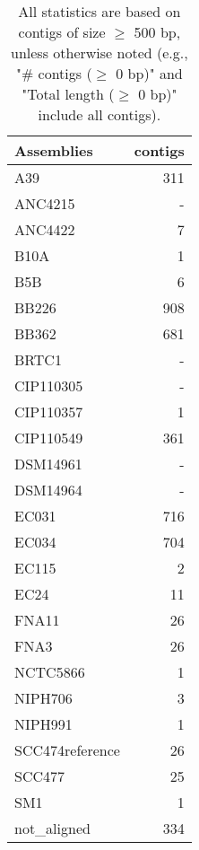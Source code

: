 \documentclass[12pt,a4paper]{article}
\begin{document}
\begin{table}[ht]
\begin{center}
\caption{All statistics are based on contigs of size $\geq$ 500 bp, unless otherwise noted (e.g., "\# contigs ($\geq$ 0 bp)" and "Total length ($\geq$ 0 bp)" include all contigs).}
\begin{tabular}{|l*{1}{|r}|}
\hline
Assemblies & contigs \\ \hline
A39 & 311 \\ \hline
ANC4215 & - \\ \hline
ANC4422 & 7 \\ \hline
B10A & 1 \\ \hline
B5B & 6 \\ \hline
BB226 & 908 \\ \hline
BB362 & 681 \\ \hline
BRTC1 & - \\ \hline
CIP110305 & - \\ \hline
CIP110357 & 1 \\ \hline
CIP110549 & 361 \\ \hline
DSM14961 & - \\ \hline
DSM14964 & - \\ \hline
EC031 & 716 \\ \hline
EC034 & 704 \\ \hline
EC115 & 2 \\ \hline
EC24 & 11 \\ \hline
FNA11 & 26 \\ \hline
FNA3 & 26 \\ \hline
NCTC5866 & 1 \\ \hline
NIPH706 & 3 \\ \hline
NIPH991 & 1 \\ \hline
SCC474reference & 26 \\ \hline
SCC477 & 25 \\ \hline
SM1 & 1 \\ \hline
not\_aligned & 334 \\ \hline
\end{tabular}
\end{center}
\end{table}
\end{document}
